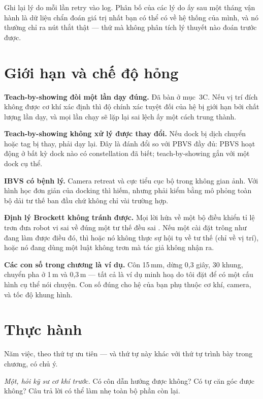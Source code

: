 \documentclass[../../marker.tex]{subfiles}
\begin{document}
Ghi lại lý do mỗi lần retry vào log. Phân bố của các lý do ấy sau một tháng vận hành là dữ liệu chẩn đoán giá trị nhất bạn có thể có về hệ thống của mình, và nó thường chỉ ra nút thắt thật --- thứ mà không phân tích lý thuyết nào đoán trước được.

\section{Giới hạn và chế độ hỏng}

\textbf{Teach-by-showing đòi một lần dạy đúng.} Đã bàn ở mục~3C. Nếu vị trí đích không được cơ khí xác định thì độ chính xác tuyệt đối của hệ bị giới hạn bởi chất lượng lần dạy, và mọi lần chạy sẽ lặp lại sai lệch ấy một cách trung thành.

\textbf{Teach-by-showing không xử lý được thay đổi.} Nếu dock bị dịch chuyển hoặc tag bị thay, phải dạy lại. Đây là đánh đổi so với PBVS đầy đủ: PBVS hoạt động ở bất kỳ dock nào có constellation đã biết; teach-by-showing gắn với một dock cụ thể.

\textbf{IBVS có bệnh lý.} Camera retreat và cực tiểu cục bộ trong không gian ảnh. Với hình học đơn giản của docking thì hiếm, nhưng phải kiểm bằng mô phỏng toàn bộ dải tư thế ban đầu chứ không chỉ vài trường hợp.

\textbf{Định lý Brockett không tránh được.} Mọi lời hứa về một bộ điều khiển tỉ lệ trơn đưa robot vi sai về đúng một tư thế đều sai \cite{brockett1983asymptotic}. Nếu một cài đặt trông như đang làm được điều đó, thì hoặc nó không thực sự hội tụ về tư thế (chỉ về vị trí), hoặc nó đang dùng một luật không trơn mà tác giả không nhận ra.

\textbf{Các con số trong chương là ví dụ.} Côn 15\,mm, dừng 0,3 giây, 30 khung, chuyển pha ở 1\,m và 0,3\,m --- tất cả là ví dụ minh hoạ do tôi đặt để có một cấu hình cụ thể nói chuyện. Con số đúng cho hệ của bạn phụ thuộc cơ khí, camera, và tốc độ khung hình.

\section{Thực hành}

Năm việc, theo thứ tự ưu tiên --- và thứ tự này khác với thứ tự trình bày trong chương, có chủ ý.

\emph{Một, hỏi kỹ sư cơ khí trước.} Có côn dẫn hướng được không? Có tự căn góc được không? Câu trả lời có thể làm nhẹ toàn bộ phần còn lại.
\end{document}
